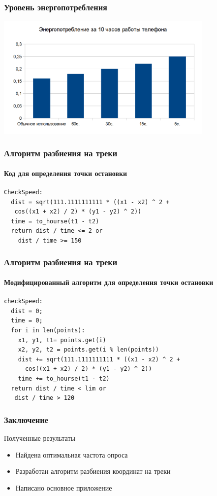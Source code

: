 \documentclass[hyperref={unicode}]{beamer}
\begin{document}
\begin{frame}
  \frametitle{Уровень энергопотребления}
	\begin{center}
		\includegraphics[width=0.8\textwidth]{images/Consuming.png}
	\end{center}
  
\end{frame}

\begin{frame}[fragile]
\frametitle{Алгоритм разбиения на треки}
\framesubtitle{Код для определения точки остановки}

\begin{lstlisting}
CheckSpeed:
  dist = sqrt(111.1111111111 * ((x1 - x2) ^ 2 + 
   cos((x1 + x2) / 2) * (y1 - y2) ^ 2))
  time = to_hourse(t1 - t2)
  return dist / time <= 2 or
    dist / time >= 150
\end{lstlisting}

\end{frame}

\begin{frame}[fragile]
\frametitle{Алгоритм разбиения на треки}
\framesubtitle{Модифицированный алгоритм для определения точки остановки}

\begin{lstlisting}
checkSpeed:
  dist = 0;
  time = 0;
  for i in len(points):
    x1, y1, t1= points.get(i)
    x2, y2, t2 = points.get(i % len(points))
    dist += sqrt(111.1111111111 * ((x1 - x2) ^ 2 + 
      cos((x1 + x2) / 2) * (y1 - y2) ^ 2))
    time += to_hourse(t1 - t2)
  return dist / time < lim or
   dist / time > 120
\end{lstlisting}

\end{frame}
\begin{frame}
  \frametitle{Заключение}
  
  Полученные результаты
  
  \begin{itemize}
  	\item Найдена оптимальная частота опроса
  	\item Разработан алгоритм разбиения координат на треки
  	\item Написано основное приложение
  \end{itemize}
  
\end{frame}
\end{document}
